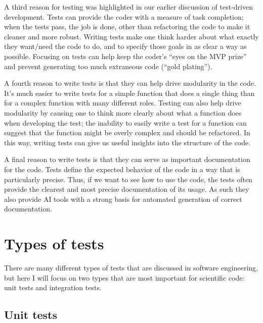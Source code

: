 A third reason for testing was highlighted in our earlier discussion of test-driven development.
Tests can provide the coder with a measure of task completion; when the tests pass, the job is done, other than refactoring the code to make it cleaner and more robust.
Writing tests make one think harder about what exactly they want/need the code to do, and to specify those goals in as clear a way as possible.
Focusing on tests can help keep the coder's ``eyes on the MVP prize'' and prevent generating too much extraneous code (``gold plating'').

A fourth reason to write tests is that they can help drive modularity in the code.
It's much easier to write tests for a simple function that does a single thing than for a complex function with many different roles.
Testing can also help drive modularity by causing one to think more clearly about what a function does when developing the test; the inability to easily write a test for a function can suggest that the function might be overly complex and should be refactored.
In this way, writing tests can give us useful insights into the structure of the code.

A final reason to write tests is that they can serve as important documentation for the code.  
Tests define the expected behavior of the code in a way that is particularly precise.  Thus, if we want to see how to use the code, the tests often provide the clearest and most precise documentation of its usage.  As such they also provide AI tools with a strong basis for automated generation of correct documentation.


\section{Types of tests}

There are many different types of tests that are discussed in software engineering, but here I will focus on two types that are most important for scientific code: unit tests and integration tests.

\subsection{Unit tests}

